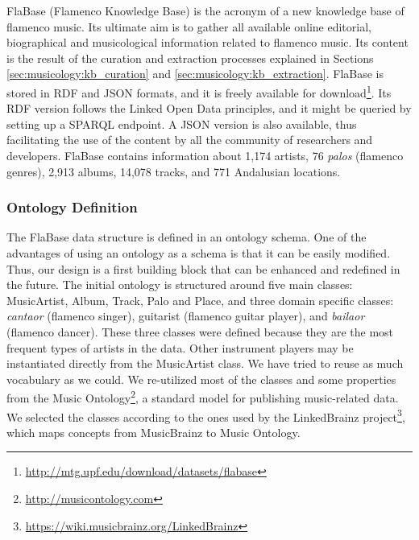 FlaBase (Flamenco Knowledge Base) is the acronym of a new knowledge base of flamenco music. Its ultimate aim is to gather all available online editorial, biographical and musicological information related to flamenco music. Its content is the result of the curation and extraction processes explained in Sections \ref{sec:musicology:kb_curation} and \ref{sec:musicology:kb_extraction}. FlaBase is stored in RDF and JSON formats, and it is freely available for download\footnote{\url{http://mtg.upf.edu/download/datasets/flabase}}. Its RDF version follows the Linked Open Data principles, and it might be queried by setting up a SPARQL endpoint. A JSON version is also available, thus facilitating the use of the content by all the community of researchers and developers. FlaBase contains information about 1,174 artists, 76 \textit{palos} (flamenco genres), 2,913 albums, 14,078 tracks, and 771 Andalusian locations.


\subsubsection{Ontology Definition}\label{sec:musicology:ontology}

The FlaBase data structure is defined in an ontology schema. One of the advantages of using an ontology as a schema is that it can be easily modified. Thus, our design is a first building block that can be enhanced and redefined in the future. The initial ontology is structured around five main classes: MusicArtist, Album, Track, Palo and Place, and three domain specific classes: \textit{cantaor} (flamenco singer), guitarist (flamenco guitar player), and \textit{bailaor} (flamenco dancer). These three classes were defined because they are the most frequent types of artists in the data. Other instrument players may be instantiated directly from the MusicArtist class. 
We have tried to reuse as much vocabulary as we could. We re-utilized most of the classes and some properties from the Music Ontology\footnote{\url{http://musicontology.com}}, a standard model for publishing music-related data. We selected the classes according to the ones used by the LinkedBrainz project\footnote{\url{https://wiki.musicbrainz.org/LinkedBrainz}}, which maps concepts from MusicBrainz to Music Ontology.

